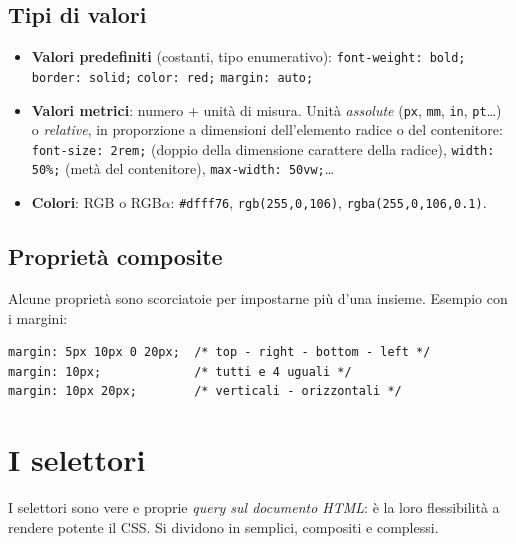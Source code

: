 \subsection{Tipi di valori}
\begin{itemize}
  \item \textbf{Valori predefiniti} (costanti, tipo enumerativo):
        \texttt{font-weight: bold;} \texttt{border: solid;} \texttt{color: red;}
        \texttt{margin: auto;}
  \item \textbf{Valori metrici}: numero + unit\`a di misura. Unit\`a \emph{assolute}
        (\texttt{px}, \texttt{mm}, \texttt{in}, \texttt{pt}\dots) o \emph{relative}, in
        proporzione a dimensioni dell'elemento radice o del contenitore:
        \texttt{font-size: 2rem;} (doppio della dimensione carattere della radice),
        \texttt{width: 50\%;} (met\`a del contenitore), \texttt{max-width: 50vw;}\dots
  \item \textbf{Colori}: RGB o RGB$\alpha$: \texttt{\#dfff76},
        \texttt{rgb(255,0,106)}, \texttt{rgba(255,0,106,0.1)}.
\end{itemize}

\subsection{Propriet\`a composite}
Alcune propriet\`a sono scorciatoie per impostarne pi\`u d'una insieme. Esempio con i margini:
\begin{lstlisting}[language=HTMLCSS]
margin: 5px 10px 0 20px;  /* top - right - bottom - left */
margin: 10px;             /* tutti e 4 uguali */
margin: 10px 20px;        /* verticali - orizzontali */
\end{lstlisting}

\section{I selettori}

I selettori sono vere e proprie \emph{query sul documento HTML}: \`e la loro flessibilit\`a a
rendere potente il CSS. Si dividono in semplici, compositi e complessi.

